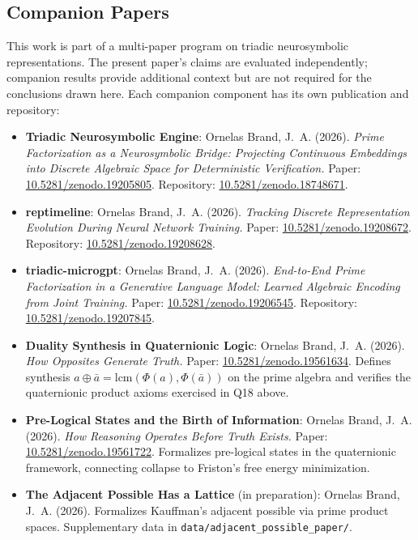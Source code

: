 \documentclass[11pt, a4paper]{article}
\begin{document}
\subsection*{Companion Papers}

This work is part of a multi-paper program on triadic neurosymbolic representations. The present paper's claims are evaluated independently; companion results provide additional context but are not required for the conclusions drawn here. Each companion component has its own publication and repository:

\begin{itemize}[nosep, leftmargin=*]
    \item \textbf{Triadic Neurosymbolic Engine}: Ornelas Brand, J.~A. (2026). \emph{Prime Factorization as a Neurosymbolic Bridge: Projecting Continuous Embeddings into Discrete Algebraic Space for Deterministic Verification.} Paper: \href{https://doi.org/10.5281/zenodo.19205805}{10.5281/zenodo.19205805}. Repository: \href{https://doi.org/10.5281/zenodo.18748671}{10.5281/zenodo.18748671}.
    \item \textbf{reptimeline}: Ornelas Brand, J.~A. (2026). \emph{Tracking Discrete Representation Evolution During Neural Network Training.} Paper: \href{https://doi.org/10.5281/zenodo.19208672}{10.5281/zenodo.19208672}. Repository: \href{https://doi.org/10.5281/zenodo.19208628}{10.5281/zenodo.19208628}.
    \item \textbf{triadic-microgpt}: Ornelas Brand, J.~A. (2026). \emph{End-to-End Prime Factorization in a Generative Language Model: Learned Algebraic Encoding from Joint Training.} Paper: \href{https://doi.org/10.5281/zenodo.19206545}{10.5281/zenodo.19206545}. Repository: \href{https://doi.org/10.5281/zenodo.19207845}{10.5281/zenodo.19207845}.
    \item \textbf{Duality Synthesis in Quaternionic Logic}: Ornelas Brand, J.~A. (2026). \emph{How Opposites Generate Truth.} Paper: \href{https://doi.org/10.5281/zenodo.19561634}{10.5281/zenodo.19561634}. Defines synthesis $a \oplus \bar{a} = \mathrm{lcm}(\Phi(a),\Phi(\bar{a}))$ on the prime algebra and verifies the quaternionic product axioms exercised in Q18 above.
    \item \textbf{Pre-Logical States and the Birth of Information}: Ornelas Brand, J.~A. (2026). \emph{How Reasoning Operates Before Truth Exists.} Paper: \href{https://doi.org/10.5281/zenodo.19561722}{10.5281/zenodo.19561722}. Formalizes pre-logical states in the quaternionic framework, connecting collapse to Friston's free energy minimization.
    \item \textbf{The Adjacent Possible Has a Lattice} (in preparation): Ornelas Brand, J.~A. (2026). Formalizes Kauffman's adjacent possible via prime product spaces. Supplementary data in \texttt{data/adjacent\_possible\_paper/}.
\end{itemize}
\end{document}

